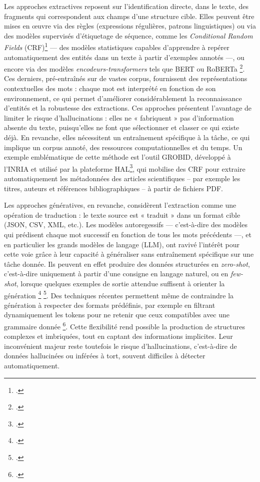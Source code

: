 Les approches extractives reposent sur l’identification directe, dans le texte, des fragments qui correspondent aux champs d’une structure cible. Elles peuvent être mises en œuvre via des règles (expressions régulières, patrons linguistiques) ou via des modèles supervisés d’étiquetage de séquence, comme les \emph{Conditional Random Fields} (CRF)\footcite[][]{finkel} — des modèles statistiques capables d’apprendre à repérer automatiquement des entités dans un texte à partir d’exemples annotés —, ou encore via des modèles \emph{encodeurs-transformers} tels que BERT ou RoBERTa \footcite[][]{devlin}. Ces derniers, pré-entraînés sur de vastes corpus, fournissent des représentations contextuelles des mots : chaque mot est interprété en fonction de son environnement, ce qui permet d’améliorer considérablement la reconnaissance d’entités et la robustesse des extractions. Ces approches présentent l’avantage de limiter le risque d’hallucinations : elles ne « fabriquent » pas d’information absente du texte, puisqu’elles ne font que sélectionner et classer ce qui existe déjà. En revanche, elles nécessitent un entraînement spécifique à la tâche, ce qui implique un corpus annoté, des ressources computationnelles et du temps. Un exemple emblématique de cette méthode est l’outil GROBID, développé à l’INRIA et utilisé par la plateforme HAL\footcite[][]{grobid}, qui mobilise des CRF pour extraire automatiquement les métadonnées des articles scientifiques -- par exemple les titres, auteurs et références bibliographiques -- à partir de fichiers PDF.

Les approches génératives, en revanche, considèrent l’extraction comme une opération de traduction : le texte source est « traduit » dans un format cible (JSON, CSV, XML, etc.). Les modèles autoregessifs — c’est-à-dire des modèles qui prédisent chaque mot successif en fonction de tous les mots précédents —, et en particulier les grands modèles de langage (LLM), ont ravivé l’intérêt pour cette voie grâce à leur capacité à généraliser sans entraînement spécifique sur une tâche donnée. Ils peuvent en effet produire des données structurées en \emph{zero-shot}, c’est-à-dire uniquement à partir d’une consigne en langage naturel, ou en \emph{few-shot}, lorsque quelques exemples de sortie attendue suffisent à orienter la génération \footcite[][]{brown} \footcite[][]{radford}. Des techniques récentes permettent même de contraindre la génération à respecter des formats prédéfinis, par exemple en filtrant dynamiquement les tokens pour ne retenir que ceux compatibles avec une grammaire donnée \footcite[][]{wei}. Cette flexibilité rend possible la production de structures complexes et imbriquées, tout en captant des informations implicites. Leur inconvénient majeur reste toutefois le risque d’hallucinations, c’est-à-dire de données hallucinées ou inférées à tort, souvent difficiles à détecter automatiquement.

